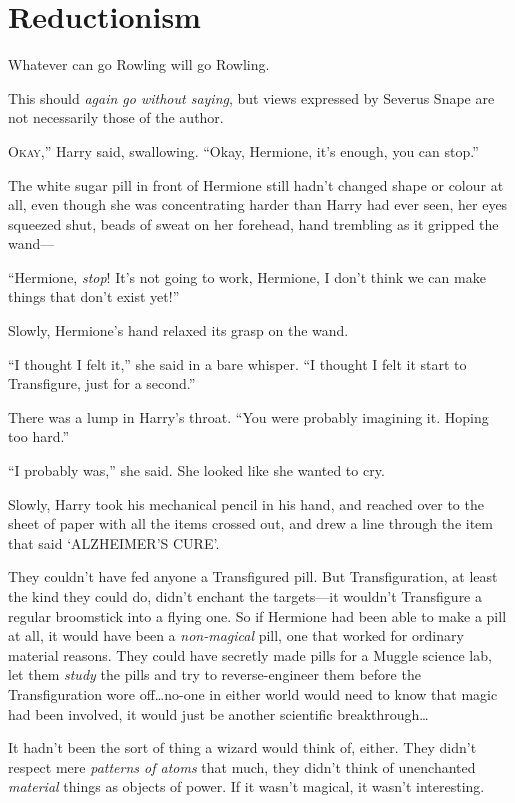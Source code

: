 \chapter{Reductionism}

\begin{chapterOpeningAuthorNote}
Whatever can go Rowling will go Rowling.

This should \emph{again go without saying}, but views expressed by Severus Snape are not necessarily those of the author.
\end{chapterOpeningAuthorNote}

\lettrine[ante=“]{O}{kay},” Harry said, swallowing. “Okay, Hermione, it’s enough, you can stop.”

The white sugar pill in front of Hermione still hadn’t changed shape or colour at all, even though she was concentrating harder than Harry had ever seen, her eyes squeezed shut, beads of sweat on her forehead, hand trembling as it gripped the wand—

“Hermione, \emph{stop}! It’s not going to work, Hermione, I don’t think we can make things that don’t exist yet!”

Slowly, Hermione’s hand relaxed its grasp on the wand.

“I thought I felt it,” she said in a bare whisper. “I thought I felt it start to Transfigure, just for a second.”

There was a lump in Harry’s throat. “You were probably imagining it. Hoping too hard.”

“I probably was,” she said. She looked like she wanted to cry.

Slowly, Harry took his mechanical pencil in his hand, and reached over to the sheet of paper with all the items crossed out, and drew a line through the item that said ‘ALZHEIMER’S CURE’.

They couldn’t have fed anyone a Transfigured pill. But Transfiguration, at least the kind they could do, didn’t enchant the targets—it wouldn’t Transfigure a regular broomstick into a flying one. So if Hermione had been able to make a pill at all, it would have been a \emph{non-magical} pill, one that worked for ordinary material reasons. They could have secretly made pills for a Muggle science lab, let them \emph{study} the pills and try to reverse-engineer them before the Transfiguration wore off…no-one in either world would need to know that magic had been involved, it would just be another scientific breakthrough…

It hadn’t been the sort of thing a wizard would think of, either. They didn’t respect mere \emph{patterns of atoms} that much, they didn’t think of unenchanted \emph{material} things as objects of power. If it wasn’t magical, it wasn’t interesting.

